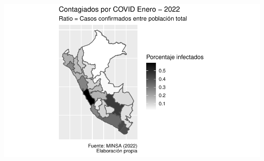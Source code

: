 \documentclass[
]{article}
\begin{document}
\includegraphics[width=0.8\linewidth]{reporte_covid_files/figure-latex/mapa2-1}
\end{document}
